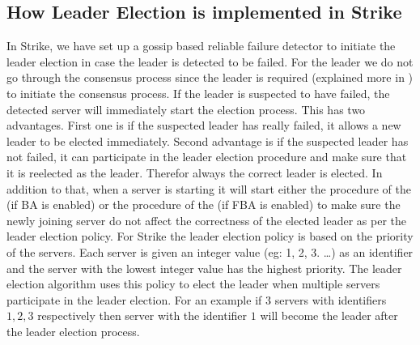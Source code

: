 \documentclass[dareport.tex]{subfiles}
\begin{document}
\subsection{How Leader Election is implemented in Strike}
In Strike, we have set up a gossip based reliable failure detector to initiate the leader election in case the leader is detected to be failed. For the leader we do not go through the consensus process since the leader is required (explained more in ) to initiate the consensus process. If the leader is suspected to have failed, the detected server will immediately start the election process. This has two advantages. First one is if the suspected leader has really failed, it allows a new leader to be elected immediately. Second advantage is if the suspected leader has not failed, it can participate in the leader election procedure and make sure that it is reelected as the leader. Therefor always the correct leader is elected. In addition to that, when a server is starting it will start either the  procedure of the  (if BA is enabled) or the  procedure of the  (if FBA is enabled) to make sure the newly joining server do not affect the correctness of the elected leader as per the leader election policy. For Strike the leader election policy is based on the priority of the servers. Each server is given an integer value (eg: 1, 2, 3. \dots) as an identifier and the server with the lowest integer value has the highest priority. The leader election algorithm uses this policy to elect the leader when multiple servers participate in the leader election. For an example if 3 servers with identifiers $ 1, 2, 3 $ respectively then server with the identifier $ 1 $ will become the leader after the leader election process.
\end{document}
